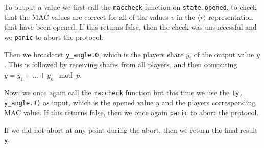 \documentclass[../main.tex]{subfiles}
\begin{document}
To output a value we first call the \lstinline{maccheck} function on \lstinline{state.opened}, to check that the MAC values are correct for all of the values $v$ in the $\langle r \rangle$ representation that have been opened. If this returns false, then the check was unsuccessful and we \lstinline{panic} to abort the protocol.

Then we broadcast \lstinline{y_angle.0}, which is the players share $y_i$ of the output value $y$. This is followed by receiving shares from all players, and then computing $y = y_1 + ... + y_n \mod p$.

Now, we once again call the \lstinline{maccheck} function but this time we use the \lstinline{(y, y_angle.1)} as input, which is the opened value $y$ and the players corresponding MAC value. If this returns false, then we once again \lstinline{panic} to abort the protocol.

If we did not abort at any point during the abort, then we return the final result \lstinline{y}.
\end{document}
